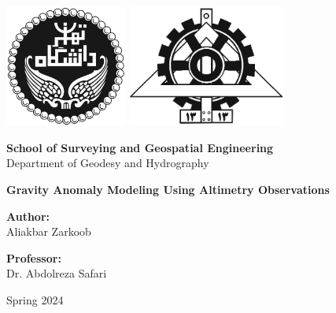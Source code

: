 \documentclass[12pt]{article}
\begin{document}
	
	\begin{titlepage}
		\begin{center}
			
			\includegraphics[height=4cm]{University_of_Tehran_Transparent_BW_logo.png} \hfill
			\includegraphics[height=4cm]{Fanni_Alt_BW_Logo.png}
			
			\vspace{1cm}
			
			\Large \textbf{School of Surveying and Geospatial Engineering}\\
			\large {Department of Geodesy and Hydrography}
			
			\vspace{3cm}
			
			\huge \textbf{Gravity Anomaly Modeling Using Altimetry Observations} \\
			\large \href{https://github.com/XIVAliakbarZarkoob/Gravity-Anomaly-Modeling-Using-Altimetry-Observations}{\faGithub}
			
			\vspace{2cm}
			
			\Large \textbf{Author:}\\
			\Large Aliakbar Zarkoob
			
			\vspace{2cm}
			
			\Large \textbf{Professor:}\\
			Dr. Abdolreza Safari
			
			\vfill
			
			\large {Spring 2024}
			
		\end{center}
	\end{titlepage}
	
\end{document}
